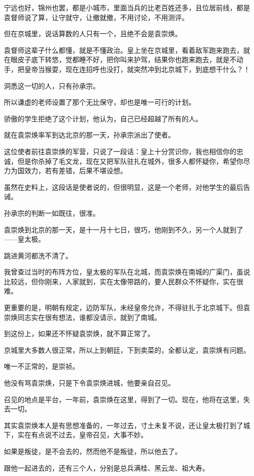 \begin{multicols}{\theparacolNo}
		宁远也好，锦州也罢，都是小城市，里面当兵的比老百姓还多，且位居前线，都是袁督师说了算，让守就守，让撤就撤，不用讨论，不用测评。

		但在京城里，说话算数的人只有一个，且绝不会是袁崇焕。

		袁督师这辈子什么都懂，就是不懂政治。皇上坐在京城里，看着敌军跑来跑去，就在眼皮子底下转悠，觉都睡不好，把你叫来护驾，结果你也跑来跑去，就是不动手，把皇帝当猴耍，现在连招呼也没打，就突然冲到北京城下，到底想干什么？！

		洞悉这一切的人，只有孙承宗。

		所以谦虚的老师设置了那个无比保守，却也是唯一可行的计划。

		骄傲的学生拒绝了这个计划，他认为，自己已经超越了所有的人。

		就在袁崇焕率军到达北京的那一天，孙承宗派出了使者。

		这位使者前往袁崇焕的军营，只说了一段话：皇上十分赏识你，我也相信你的忠诚，但是你杀掉了毛文龙，现在又把军队驻扎在城外，很多人都怀疑你，希望你尽力为国效力，若有差错，后果不堪设想。

		虽然在史料上，这段话是使者说的，但很明显，这是一个老师，对他学生的最后告诫。

		孙承宗的判断一如既往，很准。

		袁崇焕到北京的那一天，是十一月十七日，很巧，他刚到不久，另一个人就到了——皇太极。

		跳进黄河都洗不清了。

		我曾查过当时的布阵方位，皇太极的军队在北城，而袁崇焕在南城的广渠门，虽说比较远，但你刚来，人家就到，实在太像带路的，要人民群众不怀疑你，实在很难。

		更重要的是，明朝有规定，边防军队，未经皇帝允许，不得驻扎于北京城下。但袁崇焕同志实在很有想法，谁都没请示，就到了南城。

		到这份上，如果还不怀疑袁崇焕，就不算正常了。

		京城里大多数人很正常，所以上到朝廷，下到卖菜的，全都认定，袁崇焕有问题。

		唯一不正常的，是崇祯。

		他没有骂袁崇焕，只是下令袁崇焕进城，他要亲自召见。

		召见的地点是平台，一年前，袁崇焕在这里，得到了一切。现在，他将在这里，失去一切。

		其实袁崇焕本人是有思想准备的，一年过去，寸土未复不说，还让皇太极打到了城下，实在有点说不过去，皇帝召见，大事不妙。

		如果是叛徒，是不会去的，然而他不是叛徒，所以他去了。

		跟他一起进去的，还有三个人，分别是总兵满桂、黑云龙、祖大寿。


\end{multicols}
